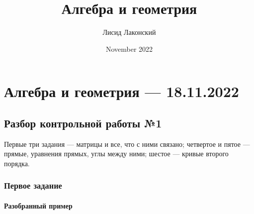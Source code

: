 \documentclass{article}
\title{Алгебра и геометрия}
\author{Лисид Лаконский}
\date{November 2022}
\begin{document}
\maketitle

\tableofcontents
\pagebreak

\section{Алгебра и геометрия — 18.11.2022}

\subsection{Разбор контрольной работы №1}

Первые три задания — матрицы и все, что с ними связано; четвертое и пятое — прямые, уравнения прямых, углы между ними; шестое — кривые второго порядка.

\subsubsection{Первое задание}

\paragraph{Разобранный пример}
\end{document}
